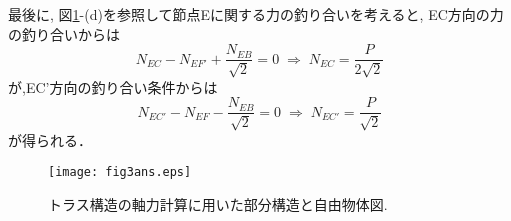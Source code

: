 \documentclass[10pt,a4j]{jarticle}
\begin{document}
最後に, 図\ref{fig:fig3}-(d)を参照して節点Eに関する力の釣り合いを考えると,
EC方向の力の釣り合いからは
\begin{equation}
	N_{EC}-N_{EF'}+\frac{N_{EB}}{\sqrt{2}}=0
	\; \Rightarrow \; N_{EC}=\frac{P}{2\sqrt{2}}
\end{equation}
が,EC'方向の釣り合い条件からは
\begin{equation}
	N_{EC'}-N_{EF}-\frac{N_{EB}}{\sqrt{2}}=0
	\; \Rightarrow \;
	N_{EC'}=\frac{P}{\sqrt{2}}
\end{equation}
が得られる．
\begin{figure}[h]
	\begin{center}
	\texttt{[image: fig3ans.eps]} 
	\end{center}
	\caption{トラス構造の軸力計算に用いた部分構造と自由物体図.} 
	\label{fig:fig3}
\end{figure}
\end{document}
